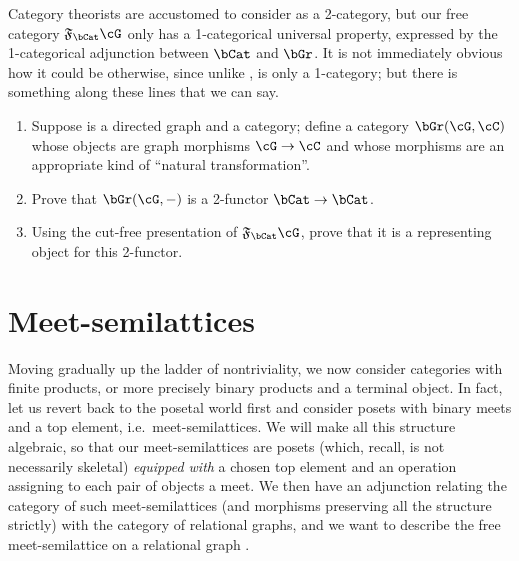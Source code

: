 \documentclass{book}
\newcommand{\F}[1]{\mathfrak{F}_{#1}}
\begin{document}
\begin{ex}\label{ex:cat-2free}
  Category theorists are accustomed to consider \bCat as a 2-category, but our free category $\F\bCat\cG$ only has a 1-categorical universal property, expressed by the 1-categorical adjunction between $\bCat$ and $\bGr$.
  It is not immediately obvious how it could be otherwise, since unlike \bCat, \bGr is only a 1-category; but there is something along these lines that we can say.
  \begin{enumerate}
  \item Suppose \cG is a directed graph and \cC a category; define a category $\bGr(\cG,\cC)$ whose objects are graph morphisms $\cG\to\cC$ and whose morphisms are an appropriate kind of ``natural transformation''.
  \item Prove that $\bGr(\cG,-)$ is a 2-functor $\bCat\to\bCat$.
  \item Using the cut-free presentation of $\F\bCat\cG$, prove that it is a representing object for this 2-functor.
  \end{enumerate}
\end{ex}


\section{Meet-semilattices}
\label{sec:mslat}

Moving gradually up the ladder of nontriviality, we now consider categories with finite products, or more precisely binary products and a terminal object.
In fact, let us revert back to the posetal world first and consider posets with binary meets and a top element, i.e.\ meet-semilattices.
We will make all this structure algebraic, so that our meet-semilattices are posets (which, recall, is not necessarily skeletal) \emph{equipped with} a chosen top element and an operation assigning to each pair of objects a meet.
We then have an adjunction relating the category \bmSLat of such meet-semilattices (and morphisms preserving all the structure strictly) with the category \bRelGr of relational graphs, and we want to describe the free meet-semilattice on a relational graph \cG.
\end{document}
